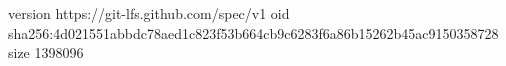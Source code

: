 version https://git-lfs.github.com/spec/v1
oid sha256:4d021551abbdc78aed1c823f53b664cb9c6283f6a86b15262b45ac9150358728
size 1398096
